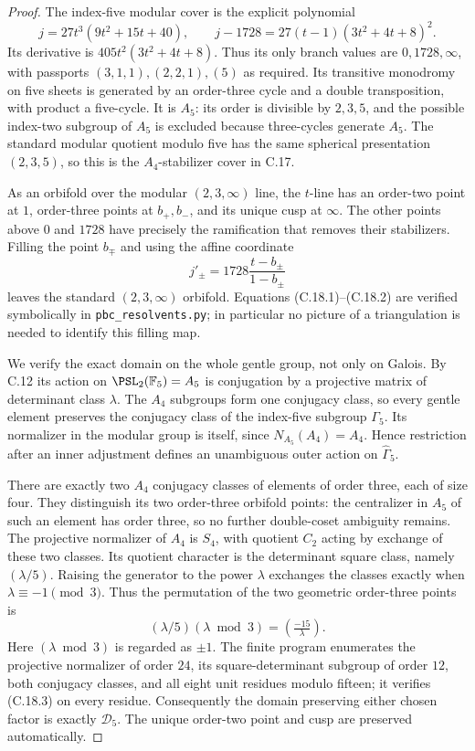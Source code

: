 \begin{proof}
The index-five modular cover is the explicit polynomial
\[
            j=27t^3(9t^2+15t+40),\qquad
 j-1728=27(t-1)(3t^2+4t+8)^2.
 \tag{C.18.1}
\]
Its derivative is $405t^2(3t^2+4t+8)$. Thus its only branch
values are $0,1728,\infty$, with passports
$(3,1,1),(2,2,1),(5)$ as required. Its transitive monodromy
on five sheets is generated by an order-three cycle and a
double transposition, with product a five-cycle. It is $A_5$:
its order is divisible by $2,3,5$, and the possible index-two
subgroup of $A_5$ is excluded because three-cycles generate
$A_5$. The standard modular quotient modulo five has the
same spherical presentation $(2,3,5)$, so this is the
$A_4$-stabilizer cover in C.17.

As an orbifold over the modular $(2,3,\infty)$ line, the
$t$-line has an order-two point at $1$, order-three points
at $b_+,b_-$, and its unique cusp at $\infty$. The other
points above $0$ and $1728$ have precisely the ramification
that removes their stabilizers. Filling the point $b_\mp$
and using the affine coordinate
\[
                  j'_\pm=1728\frac{t-b_\pm}{1-b_\pm}
 \tag{C.18.2}
\]
leaves the standard $(2,3,\infty)$ orbifold. Equations
(C.18.1)--(C.18.2) are verified symbolically in
\texttt{pbc\_resolvents.py}; in particular no picture of a
triangulation is needed to identify this filling map.

We verify the exact domain on the whole gentle group, not
only on Galois. By C.12 its action on
$\PSL_2(\mathbb F_5)=A_5$ is conjugation by a projective
matrix of determinant class $\lambda$. The $A_4$ subgroups
form one conjugacy class, so every gentle element preserves
the conjugacy class of the index-five subgroup $\Gamma_5$.
Its normalizer in the modular group is itself, since
$N_{A_5}(A_4)=A_4$. Hence restriction after an inner adjustment
defines an unambiguous outer action on $\widehat\Gamma_5$.

There are exactly two $A_4$ conjugacy classes of elements of
order three, each of size four. They distinguish its two
order-three orbifold points: the centralizer in $A_5$ of
such an element has order three, so no further double-coset
ambiguity remains. The projective normalizer of $A_4$ is
$S_4$, with quotient $C_2$ acting by exchange of these two
classes. Its quotient character is the determinant square
class, namely $(\lambda/5)$. Raising the generator to the
power $\lambda$ exchanges the classes exactly when
$\lambda\equiv-1\pmod3$. Thus the permutation of the two
geometric order-three points is
\[
                 (\lambda/5)(\lambda\bmod3)
                        =(\tfrac{-15}{\lambda}).
 \tag{C.18.3}
\]
Here $(\lambda\bmod3)$ is regarded as $\pm1$.
The finite program enumerates the projective normalizer of
order $24$, its square-determinant subgroup of order $12$,
both conjugacy classes, and all eight unit residues modulo
fifteen; it verifies (C.18.3) on every residue.
Consequently the domain preserving either chosen factor is
exactly $\mathcal D_5$. The unique order-two point and cusp
are preserved automatically.


\end{proof}
